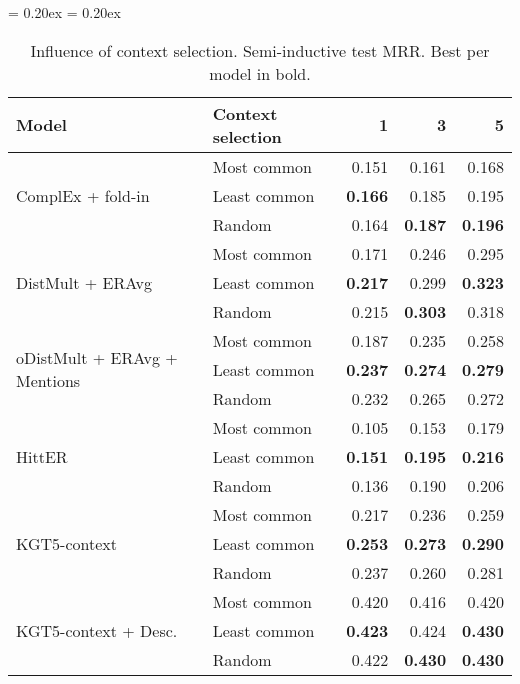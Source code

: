 \documentclass[11pt]{article}
\renewcommand\:{\colon} \newcommand{\sset}[1]{\left\{\,#1\,\right\}} \newcommand{\ssets}[1]{\left\{#1\right\}} \newcommand{\ssetn}[1]{\{\,#1\,\}}
\begin{document}
\begin{table*}
  \centering
  {
    \aboverulesep = 0.20ex
  \belowrulesep = 0.20ex
    \begin{tabular}{llrrr}
      \toprule
      \textbf{Model} & \textbf{Context selection} & \textbf{1} & \textbf{3} & \textbf{5} \\
      \midrule
      \multirow{3}{*}{ComplEx + fold-in} & Most common & 0.151 & 0.161 & 0.168 \\
      & Least common & \textbf{0.166} & 0.185 & 0.195 \\
      & Random & 0.164 & \textbf{0.187} & \textbf{0.196} \\
      \midrule
      \multirow{3}{*}{DistMult + ERAvg} & Most common & 0.171 & 0.246 & 0.295 \\
      & Least common & \textbf{0.217} & 0.299 & \textbf{0.323} \\
      & Random & 0.215 & \textbf{0.303} & 0.318 \\
      \midrule
      \multirow{3}{*}{oDistMult + ERAvg + Mentions} & Most common & 0.187 & 0.235 & 0.258 \\
      & Least common & \textbf{0.237} & \textbf{0.274} & \textbf{0.279} \\
      & Random & 0.232 & 0.265 & 0.272 \\
      \midrule
      \multirow{3}{*}{HittER} & Most common & 0.105 & 0.153 & 0.179 \\
      & Least common & \textbf{0.151} & \textbf{0.195} & \textbf{0.216} \\
      & Random & 0.136 & 0.190 & 0.206 \\
      \midrule
      \multirow{3}{*}{KGT5-context} & Most common & 0.217 & 0.236 & 0.259 \\
      & Least common & \textbf{0.253} & \textbf{0.273} & \textbf{0.290} \\
      & Random & 0.237 & 0.260 & 0.281 \\
      \midrule
      \multirow{3}{*}{KGT5-context + Desc.} & Most common & 0.420 & 0.416 & 0.420 \\
      & Least common & \textbf{0.423} & 0.424 & \textbf{0.430} \\
      & Random & 0.422 & \textbf{0.430} & \textbf{0.430} \\
      \bottomrule
    \end{tabular}
  }
  \caption{Influence of context selection. Semi-inductive test MRR. Best per model in bold.}
  \label{tab:context_selection_all}
\end{table*}
\end{document}
